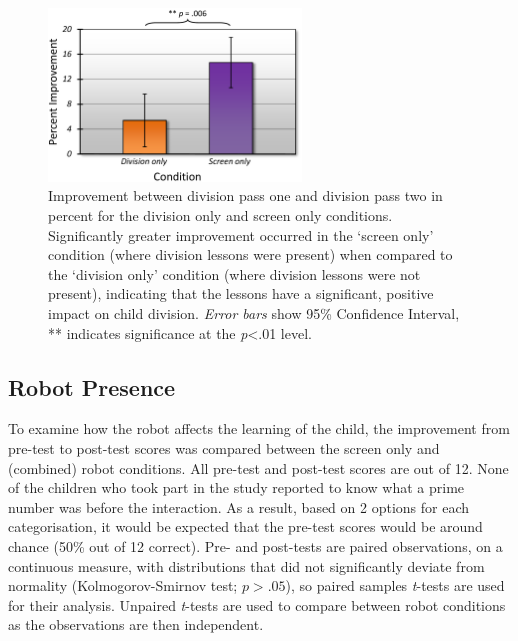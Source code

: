 \begin{figure}[t!]
    \centering
    \includegraphics[width=0.6\textwidth]{images/ch7_division_improvement.pdf}
    \caption{Improvement between division pass one and division pass two in percent for the division only and screen only conditions. Significantly greater improvement occurred in the `screen only' condition (where division lessons were present) when compared to the `division only' condition (where division lessons were not present), indicating that the lessons have a significant, positive impact on child division. \textit{Error bars} show 95\% Confidence Interval, ** indicates significance at the \textit{p}\textless .01 level.}
    \label{fig:ch7_divisionimprove}
\end{figure}

\subsection{Robot Presence}\label{sec:socasoc-results-robot}
To examine how the robot affects the \gls{learning} of the child, the improvement from pre-test to post-test scores was compared between the screen only and (combined) robot conditions. All pre-test and post-test scores are out of 12. None of the children who took part in the study reported to know what a prime number was before the interaction. As a result, based on 2 options for each categorisation, it would be expected that the pre-test scores would be around chance (50\% out of 12 correct). Pre- and post-tests are paired observations, on a continuous measure, with distributions that did not significantly deviate from normality (Kolmogorov-Smirnov test; $\textit{p}>.05$), so paired samples \textit{t}-tests are used for their analysis. Unpaired \textit{t}-tests are used to compare between robot conditions as the observations are then independent.

